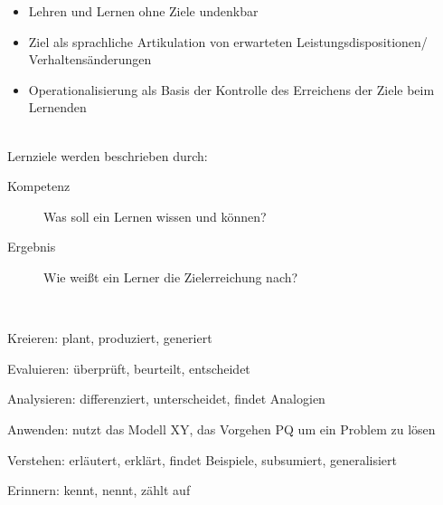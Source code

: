 \documentclass[a4paper]{article}
\begin{document}
\begin{itemize}
	\item Lehren und Lernen ohne Ziele undenkbar
	\item Ziel als sprachliche Artikulation von erwarteten Leistungsdispositionen/ Verhaltensänderungen
	\item Operationalisierung als Basis der Kontrolle des Erreichens der Ziele beim Lernenden
\end{itemize}
~\\
Lernziele werden beschrieben durch:
\begin{description}
	\item[Kompetenz] Was soll ein Lernen wissen und können?
	\item[Ergebnis] Wie weißt ein Lerner die Zielerreichung nach?
\end{description}
~\\
\begin{etaremune}
	\item Kreieren: plant, produziert, generiert
	\item Evaluieren: überprüft, beurteilt, entscheidet
	\item Analysieren: differenziert, unterscheidet, findet Analogien
	\item Anwenden: nutzt das Modell XY, das Vorgehen PQ um ein Problem zu lösen
	\item Verstehen: erläutert, erklärt, findet Beispiele, subsumiert, generalisiert
	\item Erinnern: kennt, nennt, zählt auf
\end{etaremune}
~\\
\end{document}
